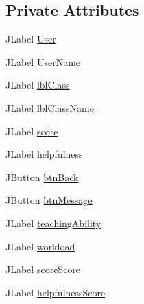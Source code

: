 \subsection*{Private Attributes}
\begin{DoxyCompactItemize}
\item 
J\+Label \mbox{\hyperlink{classcom_1_1_b_n_u_1_1pages_1_1message__board_1_1_message_board_model_a977330a066ae90d6e1632302983f62d9}{User}}
\item 
J\+Label \mbox{\hyperlink{classcom_1_1_b_n_u_1_1pages_1_1message__board_1_1_message_board_model_abc45e716279bfb662f3b3062a6228cc8}{User\+Name}}
\item 
J\+Label \mbox{\hyperlink{classcom_1_1_b_n_u_1_1pages_1_1message__board_1_1_message_board_model_a1217afe189fdc82d451d24c0e70c714f}{lbl\+Class}}
\item 
J\+Label \mbox{\hyperlink{classcom_1_1_b_n_u_1_1pages_1_1message__board_1_1_message_board_model_a9ea857547daf706be136bf46857c1de2}{lbl\+Class\+Name}}
\item 
J\+Label \mbox{\hyperlink{classcom_1_1_b_n_u_1_1pages_1_1message__board_1_1_message_board_model_add1a6ff0939f93c151ccfbed2b8b1da3}{score}}
\item 
J\+Label \mbox{\hyperlink{classcom_1_1_b_n_u_1_1pages_1_1message__board_1_1_message_board_model_a383bb848fdaa0c5207c48a08b56ff823}{helpfulness}}
\item 
J\+Button \mbox{\hyperlink{classcom_1_1_b_n_u_1_1pages_1_1message__board_1_1_message_board_model_a43973071ee1d717f1b532d6041c7d6ff}{btn\+Back}}
\item 
J\+Button \mbox{\hyperlink{classcom_1_1_b_n_u_1_1pages_1_1message__board_1_1_message_board_model_ae24edc920c68334a5f165878247bbf96}{btn\+Message}}
\item 
J\+Label \mbox{\hyperlink{classcom_1_1_b_n_u_1_1pages_1_1message__board_1_1_message_board_model_a5c09897df71966f2fc35733353351b5c}{teaching\+Ability}}
\item 
J\+Label \mbox{\hyperlink{classcom_1_1_b_n_u_1_1pages_1_1message__board_1_1_message_board_model_a9ad329feae4edd40fe0527b40a468da1}{workload}}
\item 
J\+Label \mbox{\hyperlink{classcom_1_1_b_n_u_1_1pages_1_1message__board_1_1_message_board_model_adfd336301097c9aa22c5bc0b624eb284}{score\+Score}}
\item 
J\+Label \mbox{\hyperlink{classcom_1_1_b_n_u_1_1pages_1_1message__board_1_1_message_board_model_a41e4d4bad9f48ce647a86a3983a106eb}{helpfulness\+Score}}
\item 

\end{DoxyCompactItemize}
